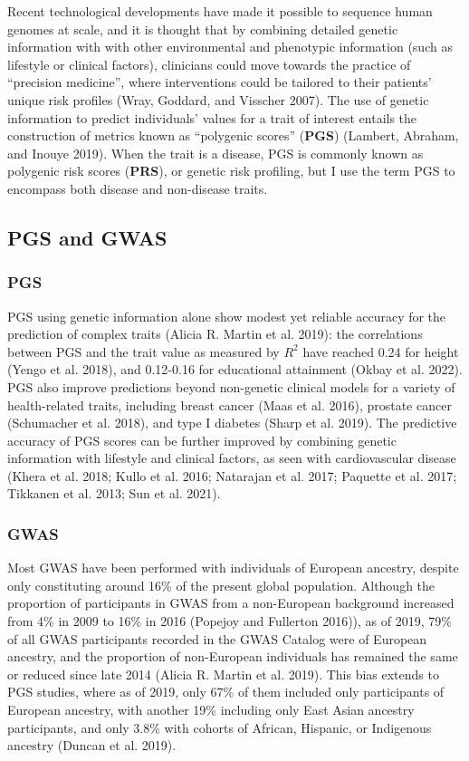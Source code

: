 \documentclass[
]{book}
\begin{document}
Recent technological developments have made it possible to sequence human genomes at scale, and it is thought that by combining detailed genetic information with with other environmental and phenotypic information (such as lifestyle or clinical factors), clinicians could move towards the practice of ``precision medicine'', where interventions could be tailored to their patients' unique risk profiles (Wray, Goddard, and Visscher 2007). The use of genetic information to predict individuals' values for a trait of interest entails the construction of metrics known as ``polygenic scores'' (\textbf{PGS}) (Lambert, Abraham, and Inouye 2019). When the trait is a disease, PGS is commonly known as polygenic risk scores (\textbf{PRS}), or genetic risk profiling, but I use the term PGS to encompass both disease and non-disease traits.

\hypertarget{pgs-intro}{%
\subsection{PGS and GWAS}\label{pgs-intro}}

\hypertarget{pgs}{%
\subsubsection{PGS}\label{pgs}}

PGS using genetic information alone show modest yet reliable accuracy for the prediction of complex traits (Alicia R. Martin et al. 2019): the correlations between PGS and the trait value as measured by \(R^2\) have reached 0.24 for height (Yengo et al. 2018), and 0.12-0.16 for educational attainment (Okbay et al. 2022). PGS also improve predictions beyond non-genetic clinical models for a variety of health-related traits, including breast cancer (Maas et al. 2016), prostate cancer (Schumacher et al. 2018), and type I diabetes (Sharp et al. 2019). The predictive accuracy of PGS scores can be further improved by combining genetic information with lifestyle and clinical factors, as seen with cardiovascular disease (Khera et al. 2018; Kullo et al. 2016; Natarajan et al. 2017; Paquette et al. 2017; Tikkanen et al. 2013; Sun et al. 2021).

\hypertarget{gwas}{%
\subsubsection{GWAS}\label{gwas}}

Most GWAS have been performed with individuals of European ancestry, despite only constituting around 16\% of the present global population. Although the proportion of participants in GWAS from a non-European background increased from 4\% in 2009 to 16\% in 2016 (Popejoy and Fullerton 2016)), as of 2019, 79\% of all GWAS participants recorded in the GWAS Catalog were of European ancestry, and the proportion of non-European individuals has remained the same or reduced since late 2014 (Alicia R. Martin et al. 2019). This bias extends to PGS studies, where as of 2019, only 67\% of them included only participants of European ancestry, with another 19\% including only East Asian ancestry participants, and only 3.8\% with cohorts of African, Hispanic, or Indigenous ancestry (Duncan et al. 2019).
\end{document}
